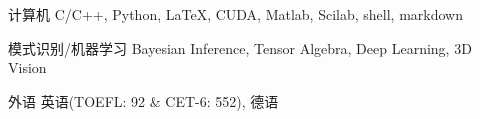 


\begin{cvskills}


\cvskill
{计算机} %
{C/C++, Python, LaTeX, CUDA, Matlab, Scilab, shell, markdown} %


\cvskill
{模式识别/机器学习} %
{Bayesian Inference, Tensor Algebra, Deep Learning, 3D Vision} %


\cvskill
{外语} %
{英语(TOEFL: 92 \& CET-6: 552), 德语} %


\end{cvskills}
